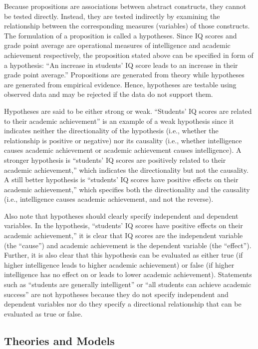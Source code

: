 \documentclass[]{book}
\theoremstyle{definition}
\theoremstyle{definition}
\theoremstyle{definition}
\theoremstyle{remark}
\begin{document}
Because propositions are associations between abstract constructs, they
cannot be tested directly. Instead, they are tested indirectly by
examining the relationship between the corresponding measures
(variables) of those constructs. The formulation of a proposition is
called a hypotheses. Since IQ scores and grade point average are
operational measures of intelligence and academic achievement
respectively, the proposition stated above can be specified in form of a
hypothesis: ``An increase in students' IQ score leads to an increase in
their grade point average.'' Propositions are generated from theory
while hypotheses are generated from empirical evidence. Hence,
hypotheses are testable using observed data and may be rejected if the
data do not support them.

Hypotheses are said to be either strong or weak. ``Students' IQ scores
are related to their academic achievement'' is an example of a weak
hypothesis since it indicates neither the directionality of the
hypothesis (i.e., whether the relationship is positive or negative) nor
its causality (i.e., whether intelligence causes academic achievement or
academic achievement causes intelligence). A stronger hypothesis is
``students' IQ scores are positively related to their academic
achievement,'' which indicates the directionality but not the causality.
A still better hypothesis is ``students' IQ scores have positive effects
on their academic achievement,'' which specifies both the directionality
and the causality (i.e., intelligence causes academic achievement, and
not the reverse).

Also note that hypotheses should clearly specify independent and
dependent variables. In the hypothesis, ``students' IQ scores have
positive effects on their academic achievement,'' it is clear that IQ
scores are the independent variable (the ``cause'') and academic
achievement is the dependent variable (the ``effect''). Further, it is
also clear that this hypothesis can be evaluated as either true (if
higher intelligence leads to higher academic achievement) or false (if
higher intelligence has no effect on or leads to lower academic
achievement). Statements such as ``students are generally intelligent''
or ``all students can achieve academic success'' are not hypotheses
because they do not specify independent and dependent variables nor do
they specify a directional relationship that can be evaluated as true or
false.

\hypertarget{theories-and-models}{%
\subsection{Theories and Models}\label{theories-and-models}}
\end{document}
